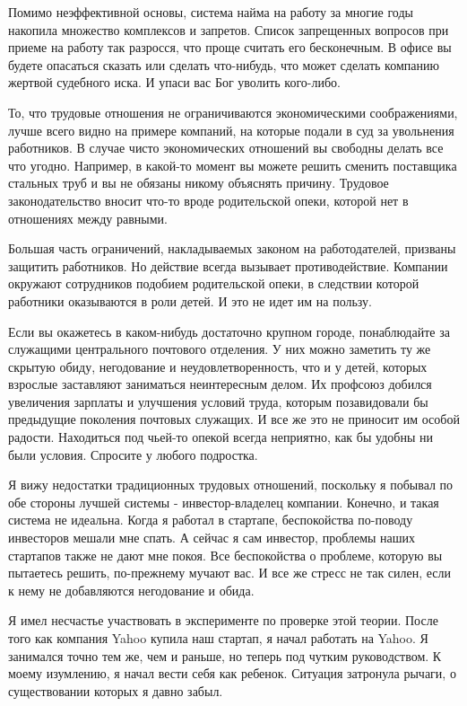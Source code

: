 \documentclass[ebook,12pt,oneside,openany]{memoir}
\begin{document}
Помимо неэффективной основы, система найма на работу за многие годы
накопила множество комплексов и запретов. Список запрещенных вопросов
при приеме на работу так разросся, что проще считать его бесконечным.
В офисе вы будете опасаться сказать или сделать что-нибудь, что может
сделать компанию жертвой судебного иска. И упаси вас Бог уволить
кого-либо.

То, что трудовые отношения не ограничиваются экономическими
соображениями, лучше всего видно на примере компаний, на которые
подали в суд за увольнения работников. В случае чисто экономических
отношений вы свободны делать все что угодно. Например, в какой-то
момент вы можете решить сменить поставщика стальных труб и вы не
обязаны никому объяснять причину. Трудовое законодательство вносит
что-то вроде родительской опеки, которой нет в отношениях между
равными.

Большая часть ограничений, накладываемых законом на работодателей,
призваны защитить работников. Но действие всегда вызывает
противодействие. Компании окружают сотрудников подобием родительской
опеки, в следствии которой работники оказываются в роли детей. И это
не идет им на пользу.

Если вы окажетесь в каком-нибудь достаточно крупном городе,
понаблюдайте за служащими центрального почтового отделения. У них
можно заметить ту же скрытую обиду, негодование и неудовлетворенность,
что и у детей, которых взрослые заставляют заниматься неинтересным
делом. Их профсоюз добился увеличения зарплаты и улучшения условий
труда, которым позавидовали бы предыдущие поколения почтовых служащих.
И все же это не приносит им особой радости. Находиться под чьей-то
опекой всегда неприятно, как бы удобны ни были условия. Спросите у
любого подростка.

Я вижу недостатки традиционных трудовых отношений, поскольку я побывал
по обе стороны лучшей системы - инвестор-владелец компании. Конечно, и
такая система не идеальна. Когда я работал в стартапе, беспокойства
по-поводу инвесторов мешали мне спать. А сейчас я сам инвестор,
проблемы наших стартапов также не дают мне покоя. Все беспокойства о
проблеме, которую вы пытаетесь решить, по-прежнему мучают вас. И все
же стресс не так силен, если к нему не добавляются негодование и
обида.

Я имел несчастье участвовать в эксперименте по проверке этой теории.
После того как компания Yahoo купила наш стартап, я начал работать на
Yahoo. Я занимался точно тем же, чем и раньше, но теперь под чутким
руководством. К моему изумлению, я начал вести себя как ребенок.
Ситуация затронула рычаги, о существовании которых я давно забыл.
\end{document}
